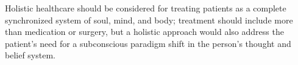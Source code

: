 \documentclass[12pt, a4paper]{article}
\begin{document}
Holistic healthcare should be considered for treating patients as a complete synchronized system of soul, mind, and body; treatment should include more than medication or surgery, but a holistic approach would also address the patient's need for a subconscious paradigm shift in the person's thought and belief system.\citep{Kobisi2012}\citep{Lipton2015}


\end{document}
